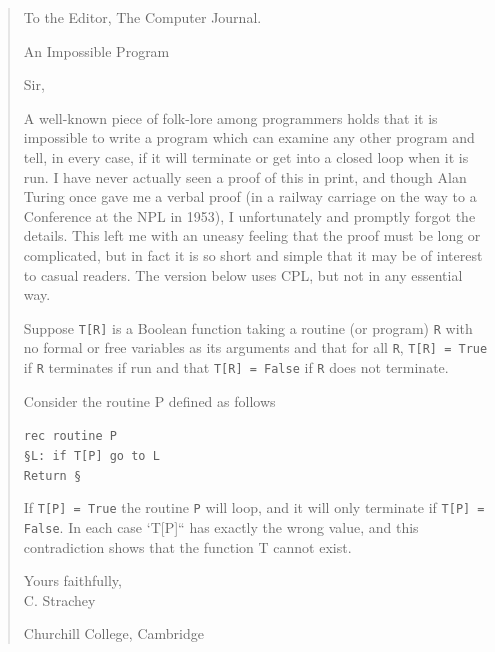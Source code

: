 \begin{quote}
To the Editor, The Computer Journal.

An Impossible Program

Sir,

A well-known piece of folk-lore among programmers holds that it is
impossible to write a program which can examine any other program and
tell, in every case, if it will terminate or get into a closed loop when
it is run. I have never actually seen a proof of this in print, and
though Alan Turing once gave me a verbal proof (in a railway carriage on
the way to a Conference at the NPL in 1953), I unfortunately and
promptly forgot the details. This left me with an uneasy feeling that
the proof must be long or complicated, but in fact it is so short and
simple that it may be of interest to casual readers. The version below
uses CPL, but not in any essential way.

Suppose \texttt{T[R]} is a Boolean function taking a routine (or
program) \texttt{R} with no formal or free variables as its arguments
and that for all \texttt{R}, \texttt{T[R] = True} if \texttt{R}
terminates if run and that \texttt{T[R] = False} if \texttt{R} does not
terminate.

Consider the routine P defined as follows

\texttt{rec routine P}\\
\texttt{§L: if T[P] go to L}\\
\texttt{Return §}

If \texttt{T[P] = True} the routine \texttt{P} will loop, and it will
only terminate if \texttt{T[P] = False}. In each case `T{[}P{]}`` has
exactly the wrong value, and this contradiction shows that the function
T cannot exist.

Yours faithfully,\\
C. Strachey

Churchill College, Cambridge
\end{quote}


